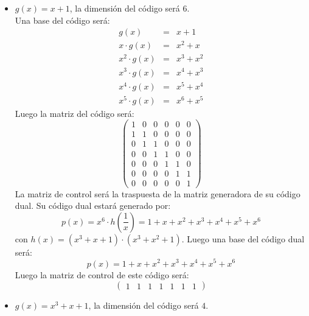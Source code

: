 \begin{itemize}
\item $g(x)=x+1$, la dimensi\'on del c\'odigo ser\'a $6$.\\

Una base del c\'odigo ser\'a:
\begin{eqnarray*}
g(x)&=&x+1\\
x\cdot g(x)&=&x^2+x\\
x^2\cdot g(x)&=&x^3+x^2\\
x^3\cdot g(x)&=&x^4+x^3\\
x^4\cdot g(x)&=&x^5+x^4\\
x^5\cdot g(x)&=&x^6+x^5
\end{eqnarray*}
Luego la matriz del c\'odigo ser\'a:
\begin{displaymath}
\left( \begin{array}{cccccc}
1&0&0&0&0&0\\
1&1&0&0&0&0\\
0&1&1&0&0&0\\
0&0&1&1&0&0\\
0&0&0&1&1&0\\
0&0&0&0&1&1\\
0&0&0&0&0&1
\end{array} \right)
\end{displaymath}
La matriz de control ser\'a la traspuesta de la matriz generadora de su c\'odigo
dual. Su c\'odigo dual estar\'a generado por:
\begin{displaymath}
p(x)=x^6\cdot h(\frac{1}{x}) = 1+x+x^2+x^3+x^4+x^5+x^6
\end{displaymath}
con $h(x)=(x^3+x+1)\cdot (x^3+x^2+1)$. Luego una base del c\'odigo dual ser\'a:
\begin{displaymath}
p(x)=1+x+x^2+x^3+x^4+x^5+x^6
\end{displaymath}
Luego la matriz de control de este c\'odigo ser\'a:
\begin{displaymath}
\left( \begin{array}{ccccccc}
1&1&1&1&1&1&1
\end{array} \right)
\end{displaymath}
\item $g(x)=x^3+x+1$, la dimensi\'on del c\'odigo ser\'a $4$.\\


\end{itemize}
